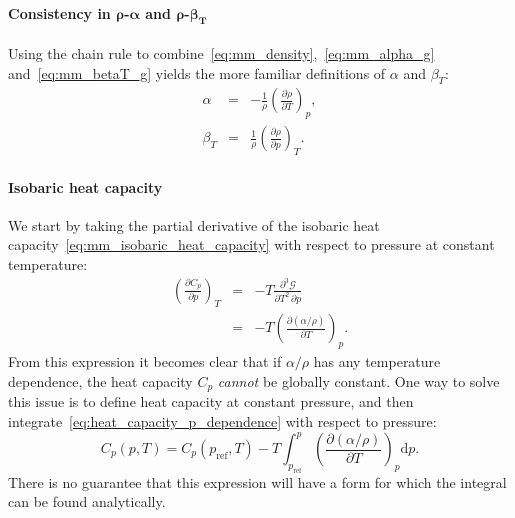 \documentclass{article}
\begin{document}
\paragraph{Consistency in $\boldsymbol{\rho}$-$\boldsymbol{\alpha}$ and $\boldsymbol{\rho}$-$\boldsymbol{\beta_T}$}
Using the chain rule to combine~\eqref{eq:mm_density},~\eqref{eq:mm_alpha_g}
and~\eqref{eq:mm_betaT_g} yields the more familiar definitions of $\alpha$ and $\beta_T$:
\begin{eqnarray}
  \alpha &=& -\frac{1}{\rho} \left( \frac{\partial \rho}{\partial T} \right)_{p}, \label{eq:mm_thermal_expansivity} \\
  \beta_T &=& \frac{1}{\rho} \left( \frac{\partial \rho}{\partial p} \right)_{T}. \label{eq:mm_isothermal_compressibility}
\end{eqnarray}

\paragraph{Isobaric heat capacity}

We start by taking the partial derivative of the isobaric heat
capacity~\eqref{eq:mm_isobaric_heat_capacity} with respect to pressure at constant temperature:
\begin{eqnarray}
  \left( \frac{\partial C_p}{\partial p} \right)_{T} &=& -T \frac{\partial^3 \mathcal{G}}{\partial {T}^2 \, \partial {p}} \\
  &=& -T \left( \frac{\partial \left(\alpha / \rho \right)}{\partial T} \right)_{p}. \label{eq:heat_capacity_p_dependence}
\end{eqnarray}
From this expression it becomes clear that if $\alpha / \rho$ has any temperature dependence,
the heat capacity $C_p$ \emph{cannot} be globally constant. One way to solve this issue is to define
heat capacity at constant pressure, and then integrate~\eqref{eq:heat_capacity_p_dependence}
with respect to pressure:
\begin{equation}
  C_p(p, T)
  = C_p(p_{\textrm{ref}}, T) -T \int_{p_{\textrm{ref}}}^p
  \left(\frac{\partial \left(\alpha / \rho \right)}{\partial T} \right)_{p}
  \text{d}p.
\end{equation}
There is no guarantee that this expression will have a form for which the integral can be found analytically.
\end{document}
